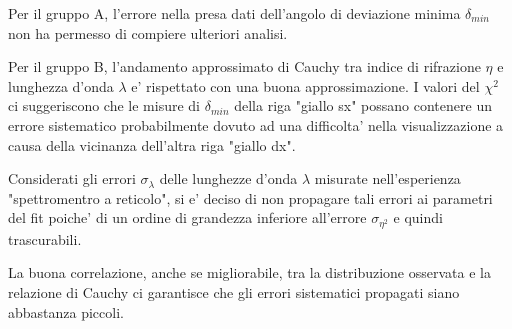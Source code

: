 Per il gruppo A, l'errore nella presa dati dell'angolo di deviazione minima $\delta_{min}$ non ha permesso di compiere ulteriori analisi.

Per il gruppo B, l'andamento approssimato di Cauchy tra indice di rifrazione $\eta$ e lunghezza d'onda $\lambda$ e' rispettato con una buona approssimazione.
I valori del $\chi^2$ ci suggeriscono che le misure di $\delta_{min}$ della riga "giallo sx" possano contenere un errore sistematico probabilmente dovuto ad una difficolta' nella visualizzazione a causa della vicinanza dell'altra riga "giallo dx".

Considerati gli errori $\sigma_{\lambda}$ delle lunghezze d'onda $\lambda$ misurate nell'esperienza "spettromentro a reticolo", si e' deciso di non propagare tali errori ai parametri del fit poiche' di un ordine di grandezza inferiore all'errore $\sigma_{\eta^2}$ e quindi trascurabili.

La buona correlazione, anche se migliorabile, tra la distribuzione osservata e la relazione di Cauchy ci garantisce che gli errori sistematici propagati siano abbastanza piccoli.